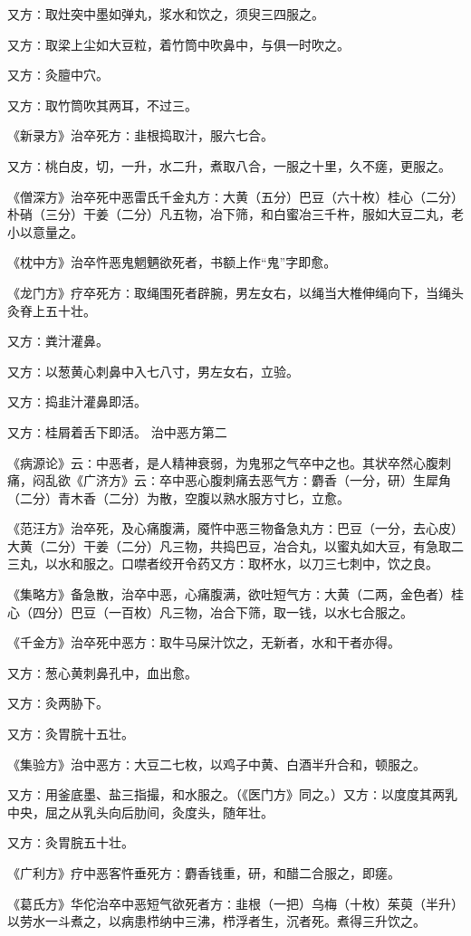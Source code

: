 \documentclass[a4paper,12pt,UTF8,twoside]{ctexbook}
\begin{document}
又方∶取灶突中墨如弹丸，浆水和饮之，须臾三四服之。

又方∶取梁上尘如大豆粒，着竹筒中吹鼻中，与俱一时吹之。

又方∶灸膻中穴。

又方∶取竹筒吹其两耳，不过三。

《新录方》治卒死方∶韭根捣取汁，服六七合。

又方∶桃白皮，切，一升，水二升，煮取八合，一服之十里，久不瘥，更服之。

《僧深方》治卒死中恶雷氏千金丸方∶大黄（五分）巴豆（六十枚）桂心（二分）朴硝（三分）干姜（二分）凡五物，冶下筛，和白蜜冶三千杵，服如大豆二丸，老小以意量之。

《枕中方》治卒忤恶鬼魍魉欲死者，书额上作“鬼”字即愈。

《龙门方》疗卒死方∶取绳围死者辟腕，男左女右，以绳当大椎伸绳向下，当绳头灸脊上五十壮。

又方∶粪汁灌鼻。

又方∶以葱黄心刺鼻中入七八寸，男左女右，立验。

又方∶捣韭汁灌鼻即活。

又方∶桂屑着舌下即活。
治中恶方第二

《病源论》云∶中恶者，是人精神衰弱，为鬼邪之气卒中之也。其状卒然心腹刺痛，闷乱欲《广济方》云∶卒中恶心腹刺痛去恶气方∶麝香（一分，研）生犀角（二分）青木香（二分）为散，空腹以熟水服方寸匕，立愈。

《范汪方》治卒死，及心痛腹满，魇忤中恶三物备急丸方∶巴豆（一分，去心皮）大黄（二分）干姜（二分）凡三物，共捣巴豆，冶合丸，以蜜丸如大豆，有急取二三丸，以水和服之。口噤者绞开令药又方∶取杯水，以刀三七刺中，饮之良。

《集略方》备急散，治卒中恶，心痛腹满，欲吐短气方∶大黄（二两，金色者）桂心（四分）巴豆（一百枚）凡三物，冶合下筛，取一钱，以水七合服之。

《千金方》治卒死中恶方∶取牛马屎汁饮之，无新者，水和干者亦得。

又方∶葱心黄刺鼻孔中，血出愈。

又方∶灸两胁下。

又方∶灸胃脘十五壮。

《集验方》治中恶方∶大豆二七枚，以鸡子中黄、白酒半升合和，顿服之。

又方∶用釜底墨、盐三指撮，和水服之。（《医门方》同之。）又方∶以度度其两乳中央，屈之从乳头向后肋间，灸度头，随年壮。

又方∶灸胃脘五十壮。

《广利方》疗中恶客忤垂死方∶麝香钱重，研，和醋二合服之，即瘥。

《葛氏方》华佗治卒中恶短气欲死者方∶韭根（一把）乌梅（十枚）茱萸（半升）以劳水一斗煮之，以病患栉纳中三沸，栉浮者生，沉者死。煮得三升饮之。
\end{document}

